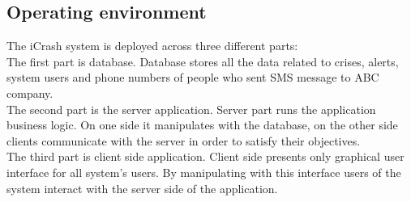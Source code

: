 \subsection{Operating environment}
The iCrash system is deployed across three different parts:\\
The first part is database. Database stores all the data related to crises,
alerts, system users and phone numbers of people who sent SMS message to ABC
company.\\
The second part is the server application. Server part runs the application
business logic. On one side it manipulates with the database, on the other side
clients communicate with the server in order to satisfy their objectives.\\
The third part is client side application. Client side presents only graphical
user interface for all system’s users. By manipulating with this interface users
of the system interact with the server side of the application.

